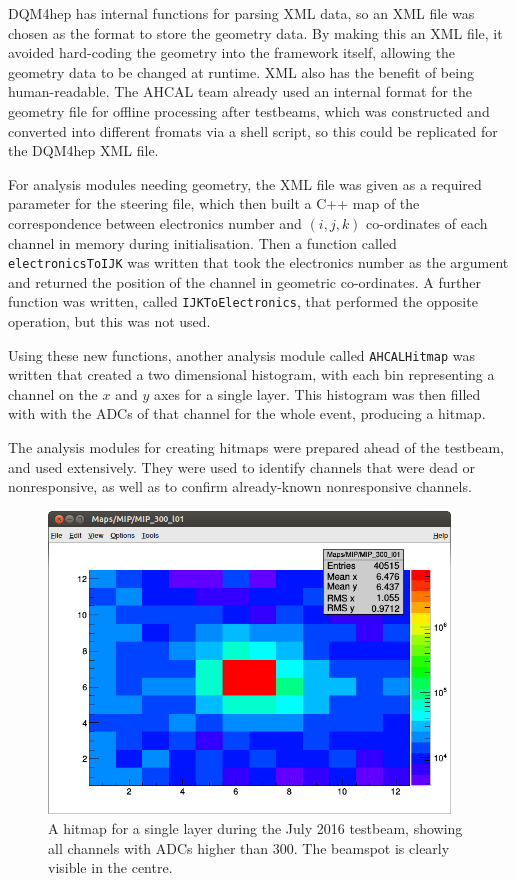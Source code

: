 DQM4hep has internal functions for parsing XML data, so an XML file was chosen as the format to store the geometry data. By making this an XML file, it avoided hard-coding the geometry into the framework itself, allowing the geometry data to be changed at runtime. XML also has the benefit of being human-readable. The AHCAL team already used an internal format for the geometry file for offline processing after testbeams, which was constructed and converted into different fromats via a  shell script, so this could be replicated for the DQM4hep XML file.

For analysis modules needing geometry, the XML file was given as a required parameter for the steering file, which then built a C++ map of the correspondence between electronics number and $(i,j,k)$ co-ordinates of each channel in memory during initialisation. Then a function called \texttt{electronicsToIJK} was written that took the electronics number as the argument and returned the position of the channel in geometric co-ordinates. A further function was written, called \texttt{IJKToElectronics}, that performed the opposite operation, but this was not used. 

Using these new functions, another analysis module called \texttt{AHCALHitmap} was written that created a two dimensional histogram, with each bin representing a channel on the $x$ and $y$ axes for a single layer. This histogram was then filled with with the ADCs of that channel for the whole event, producing a hitmap.

The analysis modules for creating hitmaps were prepared ahead of the testbeam, and used extensively. They were used to identify channels that were dead or nonresponsive, as well as to confirm already-known nonresponsive channels.

\begin{figure}[p]
	\centering
	\includegraphics[width=0.95\textwidth]{../Pictures/AHCALHitmapSingle.png}
	\caption{A hitmap for a single layer during the July 2016 testbeam, showing all channels with ADCs higher than 300. The beamspot is clearly visible in the centre.}
	\label{figure:aida/july2016/single-hitmap}
\end{figure}


